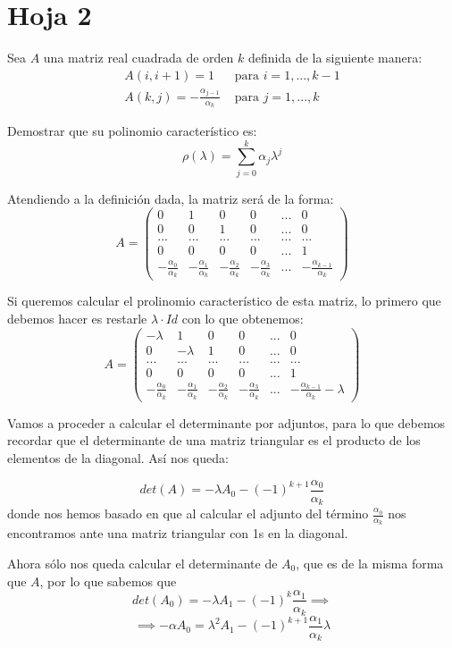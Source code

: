 \section{Hoja 2}
\begin{problem}[1]
Sea $A$ una matriz real cuadrada de orden $k$ definida de la siguiente manera:
\[\begin{array}{ll}
A(i,i+1) = 1 & \text{ para } i=1,...,k-1\\
A(k,j)=-\frac{α_{j-1}}{α_k} & \text{ para } j=1,...,k
\end{array}\]

Demostrar que su polinomio característico es:
\[ρ(λ) = \sum_{j=0}^kα_jλ^j\]
\solution


Atendiendo a la definición dada, la matriz será de la forma:
\[A=\left(\begin{array}{cccccc}
0 & 1 & 0 & 0 & ... & 0 \\
0 & 0 & 1 & 0 & ... & 0 \\
... & ... & ... & ... & ... & ... \\
0 & 0 & 0 & 0 & ...& 1 \\
-\frac{α_0}{α_k} & -\frac{α_1}{α_k} & -\frac{α_2}{α_k} & -\frac{α_3}{α_k} & ... & -\frac{α_{k-1}}{α_k}
\end{array} \right)\]

Si queremos calcular el prolinomio característico de esta matriz, lo primero que debemos hacer es restarle $λ \cdot Id$ con lo que obtenemos:
\[A = \left(\begin{array}{cccccc}
-λ & 1 & 0 & 0 & ... & 0 \\
0 & -λ & 1 & 0 & ... & 0 \\
... & ... & ... & ... & ... & ... \\
0 & 0 & 0 & 0 & ...& 1 \\
-\frac{α_0}{α_k} & -\frac{α_1}{α_k} & -\frac{α_2}{α_k} & -\frac{α_3}{α_k} & ... & -\frac{α_{k-1}}{α_k} - λ
\end{array} \right)\]

Vamos a proceder a calcular el determinante por adjuntos, para lo que debemos recordar que el determinante de una matriz triangular es el producto de los elementos de la diagonal. Así nos queda:

\[det(A) = -λA_0 -(-1)^{k+1}\frac{α_0}{α_k}\]
donde nos hemos basado en que al calcular el adjunto del término $\frac{α_0}{α_k}$ nos encontramos ante una matriz triangular con 1s en la diagonal.

Ahora sólo nos queda calcular el determinante de $A_0$, que es de la misma forma que $A$, por lo que sabemos que
\[det(A_0) = -λA_1 - (-1)^{k}\frac{α_1}{α_k}\implies\]
\[\implies -αA_0 = λ^2A_1 -(-1)^{k+1}\frac{α_1}{α_k}λ\]


\end{problem}
